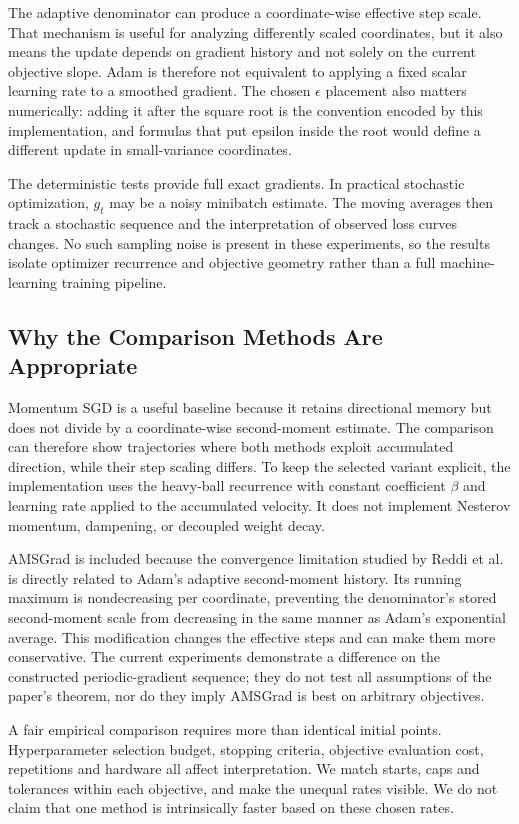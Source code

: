 ﻿\documentclass[conference]{IEEEtran}
\begin{document}
The adaptive denominator can produce a coordinate-wise effective step scale. That mechanism is useful for analyzing differently scaled coordinates, but it also means the update depends on gradient history and not solely on the current objective slope. Adam is therefore not equivalent to applying a fixed scalar learning rate to a smoothed gradient. The chosen $\epsilon$ placement also matters numerically: adding it after the square root is the convention encoded by this implementation, and formulas that put epsilon inside the root would define a different update in small-variance coordinates.

The deterministic tests provide full exact gradients. In practical stochastic optimization, $g_t$ may be a noisy minibatch estimate. The moving averages then track a stochastic sequence and the interpretation of observed loss curves changes. No such sampling noise is present in these experiments, so the results isolate optimizer recurrence and objective geometry rather than a full machine-learning training pipeline.
\subsection{Why the Comparison Methods Are Appropriate}
Momentum SGD is a useful baseline because it retains directional memory but does not divide by a coordinate-wise second-moment estimate. The comparison can therefore show trajectories where both methods exploit accumulated direction, while their step scaling differs. To keep the selected variant explicit, the implementation uses the heavy-ball recurrence with constant coefficient $\beta$ and learning rate applied to the accumulated velocity. It does not implement Nesterov momentum, dampening, or decoupled weight decay.

AMSGrad is included because the convergence limitation studied by Reddi et al. is directly related to Adam's adaptive second-moment history. Its running maximum is nondecreasing per coordinate, preventing the denominator's stored second-moment scale from decreasing in the same manner as Adam's exponential average. This modification changes the effective steps and can make them more conservative. The current experiments demonstrate a difference on the constructed periodic-gradient sequence; they do not test all assumptions of the paper's theorem, nor do they imply AMSGrad is best on arbitrary objectives.

A fair empirical comparison requires more than identical initial points. Hyperparameter selection budget, stopping criteria, objective evaluation cost, repetitions and hardware all affect interpretation. We match starts, caps and tolerances within each objective, and make the unequal rates visible. We do not claim that one method is intrinsically faster based on these chosen rates.
\end{document}
